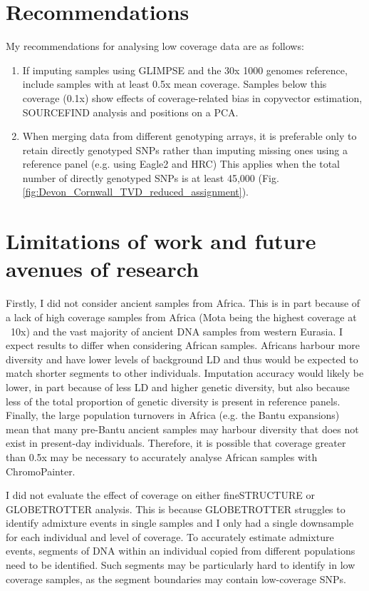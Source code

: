 \section{Recommendations}

My recommendations for analysing low coverage data are as follows:

\begin{enumerate}
\item If imputing samples using GLIMPSE and the 30x 1000 genomes reference, include samples with at least 0.5x mean coverage. Samples below this coverage (0.1x) show effects of coverage-related bias in copyvector estimation, SOURCEFIND analysis and positions on a PCA. 
\item When merging data from different genotyping arrays, it is preferable only to retain directly genotyped SNPs rather than imputing missing ones using a reference panel (e.g. using Eagle2 and HRC) This applies when the total number of directly genotyped SNPs is at least 45,000 (Fig. \ref{fig:Devon_Cornwall_TVD_reduced_assignment}).
\end{enumerate}

\section{Limitations of work and future avenues of research}


Firstly, I did not consider ancient samples from Africa. This is in part because of a lack of high coverage samples from Africa (Mota being the highest coverage at ~10x) and the vast majority of ancient DNA samples from western Eurasia. I expect results to differ when considering African samples. Africans harbour more diversity and have lower levels of background LD \cite{bosch2009decay} and thus would be expected to match shorter segments to other individuals. Imputation accuracy would likely be lower, in part because of less LD and higher genetic diversity, but also because less of the total proportion of genetic diversity is present in reference panels. Finally, the large population turnovers in Africa (e.g. the Bantu expansions) mean that many pre-Bantu ancient samples may harbour diversity that does not exist in present-day individuals. Therefore, it is possible that coverage greater than 0.5x may be necessary to accurately analyse African samples with ChromoPainter. 

I did not evaluate the effect of coverage on either fineSTRUCTURE or GLOBETROTTER analysis. This is because GLOBETROTTER struggles to identify admixture events in single samples and I only had a single downsample for each individual and level of coverage. To accurately estimate admixture events, segments of DNA within an individual copied from different populations need to be identified. Such segments may be particularly hard to identify in low coverage samples, as the segment boundaries may contain low-coverage SNPs.   


